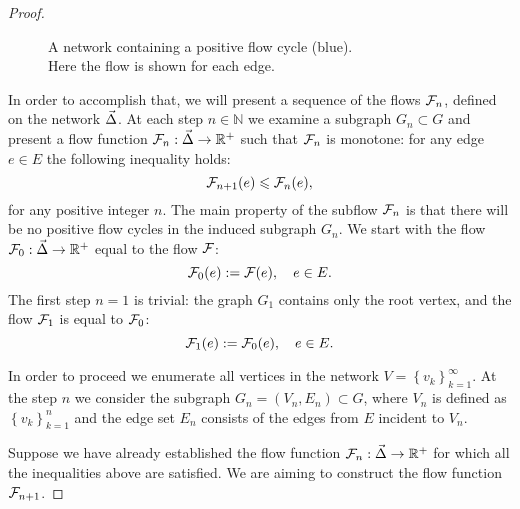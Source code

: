 \documentclass[12pt]{article}
\begin{document}
\begin{proof}
\begin{figure}
\begin{center}
        \caption{A network containing a positive flow cycle (blue).\\ Here the flow is shown for each edge.} 
        \label{positive-flow}
        \end{center}
      \end{figure}
      In order to accomplish that, we will present a sequence of the flows $\mathcal{F}_{n}$, defined on the network $\vec{\Delta}$.
      At each step $n \in \mathbb{N}$ we examine a subgraph $G_n \subset G$ and present a flow function $\mathcal{F}_{n}: \vec{\Delta} \to \mathbb{R}^{+}$
        such that $\mathcal{F}_{n}$ is monotone: for any edge $e \in E$ the following inequality holds:
      \[
        \mathcal{F}_{n+1}(e) \leqslant \mathcal{F}_{n}(e),
      \]
      for any positive integer $n$.
      The main property of the subflow $\mathcal{F}_{n}$ is that there will be no positive flow cycles in the induced subgraph
      $G_n$.
      We start with the flow $\mathcal{F}_{0}:\vec{\Delta} \to \mathbb{R}^+$ equal to the flow $\mathcal{F}$:
      \[
        \mathcal{F}_{0}(e) := \mathcal{F}(e), \quad e \in E.
      \]
      The first step $n = 1$ is trivial: the graph $G_1$ contains only the root vertex, and
        the flow $\mathcal{F}_{1}$ is equal to $\mathcal{F}_{0}$:
      \[
        \mathcal{F}_{1}(e) := \mathcal{F}_{0}(e), \quad e \in E.
      \]

      In order to proceed we enumerate all vertices in the network $V = \left\{v_k\right\}_{k=1}^\infty$.
      At the step $n$ we consider the subgraph $G_n = (V_n, E_n) \subset G$, where $V_n$ is defined as $\left\{v_k\right\}_{k=1}^n$
        and the edge set $E_n$ consists of the edges from $E$ incident to $V_n$.

      Suppose we have already established the flow function $\mathcal{F}_{n}: \vec{\Delta} \to \mathbb{R}^{+}$ for which
        all the inequalities above are satisfied.
      We are aiming to construct the flow function $\mathcal{F}_{n+1}$.


\end{proof}
\end{document}
